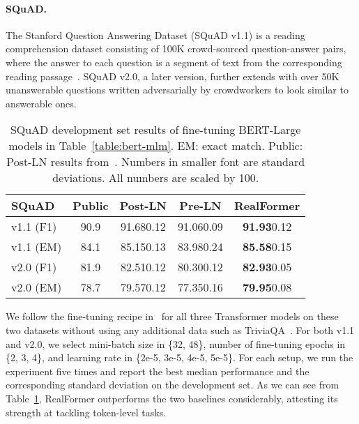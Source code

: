 \documentclass[11pt,a4paper]{article}
\begin{document}
\paragraph{SQuAD.}
The Stanford Question Answering Dataset (SQuAD v1.1) is a reading comprehension dataset consisting of 100K crowd-sourced question-answer pairs, where the answer to each question is a segment of text from the corresponding reading passage~\citep{Rajpurkar-2016-squad}.
SQuAD v2.0, a later version, further extends with over 50K unanswerable questions written adversarially by crowdworkers to look similar to answerable ones.


\begin{table}[t]
\setlength{\tabcolsep}{0.9pt}
\centering
\begin{tabular}{l|cccc}
\hline \textbf{SQuAD} &\textbf{Public}  & \textbf{Post-LN} & \textbf{Pre-LN} & \textbf{RealFormer} \\ \hline
v1.1 \small{(F1)}   & 90.9  & 91.68\tiny{0.12}  & 91.06\tiny{0.09}    & \textbf{91.93}\tiny{0.12}   \\
v1.1 \small{(EM)}   & 84.1  & 85.15\tiny{0.13}  & 83.98\tiny{0.24}    & \textbf{85.58}\tiny{0.15}   \\
v2.0 \small{(F1)}   & 81.9  & 82.51\tiny{0.12}  & 80.30\tiny{0.12}    & \textbf{82.93}\tiny{0.05}   \\
v2.0 \small{(EM)}   & 78.7  & 79.57\tiny{0.12}  & 77.35\tiny{0.16}    & \textbf{79.95}\tiny{0.08}  \\
\hline
\end{tabular}
\caption{\label{table:squad} SQuAD development set results of fine-tuning BERT-Large models in Table~\ref{table:bert-mlm}. EM: exact match. Public: Post-LN results from~\citet{Devlin-2019-bert}. Numbers in smaller font are standard deviations. All numbers are scaled by 100.}
\end{table}


We follow the fine-tuning recipe in~\citet{Devlin-2019-bert} for all three Transformer models on these two datasets without using any additional data such as TriviaQA~\citep{Joshi-2017-triviaqa}.
For both v1.1 and v2.0, we select mini-batch size in \{32, 48\}, number of fine-tuning epochs in \{2, 3, 4\}, and learning rate in \{2e-5, 3e-5, 4e-5, 5e-5\}. For each setup, we run the experiment five times and report the best median performance and the corresponding standard deviation on the development set. As we can see from Table~\ref{table:squad}, RealFormer outperforms the two baselines considerably, attesting its strength at tackling token-level tasks.
\end{document}
